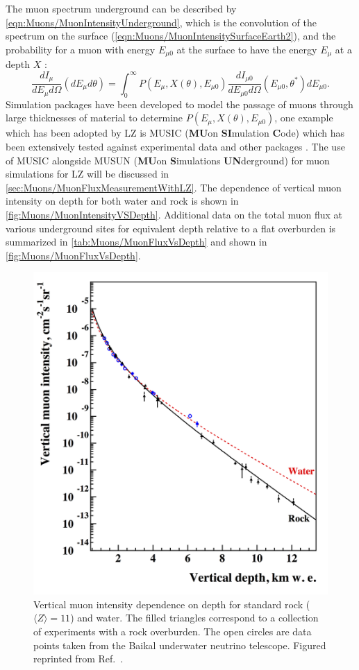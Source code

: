 The muon spectrum underground can be described by \autoref{eqn:Muons/MuonIntensityUnderground}, which is the convolution of the spectrum on the surface (\autoref{eqn:Muons/MuonIntensitySurfaceEarth2}), and the probability for a muon with energy $E_{\mu 0}$ at the surface to have the energy $E_\mu$ at a depth $X$ \cite{musun}:
\begin{equation}\label{eqn:Muons/MuonIntensityUnderground}
    \frac{dI_\mu}{dE_\mu d\Omega}(dE_\mu d\theta)=\int^\infty_0P(E_\mu,X(\theta),E_{\mu0})\frac{dI_{\mu0}}{dE_{\mu0}d\Omega}(E_{\mu0},\theta^*)dE_{\mu 0}.
\end{equation}
Simulation packages have been developed to model the passage of muons through large thicknesses of material to determine $P(E_\mu,X(\theta),E_{\mu0})$, one example which has been adopted by LZ is MUSIC (\textbf{MU}on \textbf{SI}mulation \textbf{C}ode) which has been extensively tested against experimental data and other packages \cite{musun,LVD:1998lir,PhysRevD.60.112001,Tang:2006uu,MACRO:2003qix}. The use of MUSIC alongside MUSUN (\textbf{MU}on \textbf{S}imulations \textbf{UN}derground) for muon simulations for LZ will be discussed in \autoref{sec:Muons/MuonFluxMeasurementWithLZ}.
The dependence of vertical muon intensity on depth for both water and rock is shown in \autoref{fig:Muons/MuonIntensityVSDepth}. Additional data on the total muon flux at various underground sites for equivalent depth relative to a flat overburden is summarized in \autoref{tab:Muons/MuonFluxVsDepth} and shown in \autoref{fig:Muons/MuonFluxVsDepth}.
\begin{figure}[h!]
    \centering
    \includegraphics[width=0.7\linewidth]{figures/Muons/MuonIntensityVSVertDepth.png}
    \caption[Vertical muon intensity dependence on depth for standard rock ($\langle Z\rangle=11$) and water.]{Vertical muon intensity dependence on depth for standard rock ($\langle Z\rangle=11$) and water. The filled triangles correspond to a collection of experiments with a rock overburden. The open circles are data points taken from the Baikal underwater neutrino telescope. Figured reprinted from Ref.~\cite{dwoodward:thesis}.}
    \label{fig:Muons/MuonIntensityVSDepth}
\end{figure}
